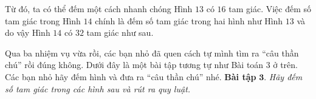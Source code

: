 	\begin{multicols}{2}
		Từ đó, ta có thể đếm một cách nhanh chóng Hình $13$ có $16$ tam giác. Việc đếm số tam giác trong Hình $14$ chính là đếm số tam giác trong hai hình như Hình $13$ và do vậy Hình $14$ có $32$ tam giác như sau.
		\begin{figure}[H]
			\centering
			\vspace*{-15pt}
			\captionsetup{labelformat= empty, justification=centering}
			\captionsetup[subfigure]{labelformat=empty}
			\hfill{}
			\hfill
			\hfill
			\vspace*{-10pt}
		\end{figure} 
	\end{multicols}
	Qua ba nhiệm vụ vừa rồi, các bạn nhỏ đã quen cách tự mình tìm ra “câu thần chú” rồi đúng không. Dưới đây là một bài tập tương tự như Bài toán $3$ ở trên. Các bạn nhỏ hãy đếm hình và đưa ra “câu thần chú” nhé.
	\vskip 0.1cm
	\textbf{\color{toancuabi}Bài tập} $\pmb{3}$. \textit{Hãy đếm số tam giác trong các hình sau và rút ra quy luật.}
	\begin{figure}[H]
		\centering
		\vspace*{-5pt}
		\captionsetup{labelformat= empty, justification=centering}
		\captionsetup[subfigure]{labelformat=empty}
		\hfill{}\hfill
		\hfill
		\vspace*{-5pt}
	\end{figure} 
